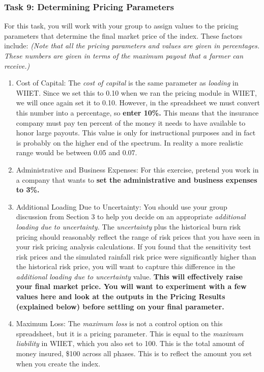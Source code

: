 \documentclass[letterpaper,10pt,english]{sphinxmanual}
\begin{document}
\subsubsection{Task 9: Determining Pricing Parameters}
\label{wiiet/wiiet_initialtomarketpricing_Web:task-9-determining-pricing-parameters}
For this task, you will work with your group to assign values to the pricing parameters that determine the final market price of the index. These factors include: \emph{(Note that all the pricing parameters and values are given in percentages. These numbers are given in terms of the maximum payout that a farmer can receive.)}
\begin{enumerate}
\item {} 
Cost of Capital: The \emph{cost of capital} is the same parameter as \emph{loading} in WIIET. Since we set this to 0.10 when we ran the pricing module in WIIET, we will once again set it to 0.10. However, in the spreadsheet we must convert this number into a percentage, so \textbf{enter 10\%.} This means that the insurance company must pay ten percent of the money it needs to have available to honor large payouts. This value is only for instructional purposes and in fact is probably on the higher end of the spectrum. In reality a more realistic range would be between 0.05 and 0.07.

\item {} 
Administrative and Business Expenses: For this exercise, pretend you work in a company that wants to \textbf{set the administrative and business expenses to 3\%.}

\item {} 
Additional Loading Due to Uncertainty: You should use your group discussion from Section 3 to help you decide on an appropriate \emph{additional loading due to uncertainty.} The \emph{uncertainty} plus the historical burn risk pricing should reasonably reflect the range of risk prices that you have seen in your risk pricing analysis calculations. If you found that the sensitivity test risk prices and the simulated rainfall risk price were significantly higher than the historical risk price, you will want to capture this difference in the \emph{additional loading due to uncertainty} value. \textbf{This will effectively raise your final market price. You will want to experiment with a few values here and look at the outputs in the Pricing Results (explained below) before settling on your final parameter.}

\item {} 
Maximum Loss: The \emph{maximum loss} is not a control option on this spreadsheet, but it is a pricing parameter. This is equal to the \emph{maximum liability} in WIIET, which you also set to 100. This is the total amount of money insured, \$100 across all phases. This is to reflect the amount you set when you create the index.

\end{enumerate}
\end{document}
